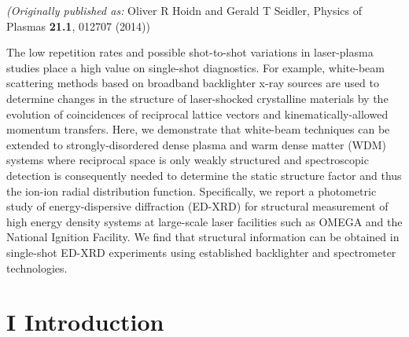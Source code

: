 \emph{(Originally published as: }
Oliver R Hoidn and Gerald T Seidler, Physics of Plasmas {\bfseries 21.1}, 012707 (2014))

\begin{addmargin}[4em]{1em}
The low repetition rates and possible shot-to-shot variations in
laser-plasma studies place a high value on single-shot diagnostics. For
example, white-beam scattering methods based on broadband backlighter
x-ray sources are used to determine changes in the structure of
laser-shocked crystalline materials by the evolution of coincidences of
reciprocal lattice vectors and kinematically-allowed momentum transfers.
Here, we demonstrate that white-beam techniques can be extended to
strongly-disordered dense plasma and warm dense matter (WDM) systems
where reciprocal space is only weakly structured and spectroscopic
detection is consequently needed to determine the static structure
factor and thus the ion-ion radial distribution function. Specifically,
we report a photometric study of energy-dispersive diffraction (ED-XRD)
for structural measurement of high energy density systems at large-scale
laser facilities such as OMEGA and the National Ignition Facility. We
find that structural information can be obtained in single-shot ED-XRD
experiments using established backlighter and spectrometer technologies.
\end{addmargin}


\section{I Introduction}\label{i-introduction}

